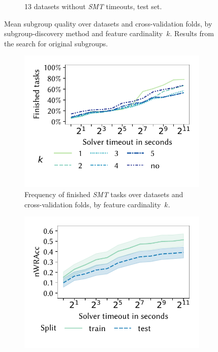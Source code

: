 \documentclass[acmsmall]{acmart} %
\theoremstyle{acmplain}
\theoremstyle{acmdefinition}
\begin{document}
\begin{figure}[t]
\begin{subfigure}[t]{0.48\textwidth}
		\caption{13 datasets without \emph{SMT} timeouts, test set.}
		\label{fig:csd:cardinality-test-nwracc-no-timeout-datasets}
	\end{subfigure}
	\caption{
		Mean subgroup quality over datasets and cross-validation folds, by subgroup-discovery method and feature cardinality~$k$.
		Results from the search for original subgroups.
	}
	\label{fig:csd:cardinality}
\end{figure}

\begin{figure}[t]
	\centering
	\begin{subfigure}[t]{0.48\textwidth}
		\centering
		\includegraphics[width=\textwidth, trim=10 25 10 10, clip]{plots/csd-timeouts-finished-tasks.pdf}
		\caption{
			Frequency of finished \emph{SMT} tasks over datasets and cross-validation folds, by feature cardinality~$k$.
		}
		\label{fig:csd:timeouts-finished-tasks}
	\end{subfigure}
	\hfill
	\begin{subfigure}[t]{0.48\textwidth}
		\centering
		\includegraphics[width=\textwidth, trim=10 25 10 10, clip]{plots/csd-timeouts-nwracc.pdf}

\end{subfigure}
\end{figure}
\end{document}
